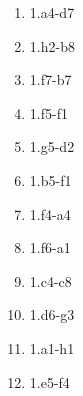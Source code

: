 \begin{enumerate}
\setcounter{enumi}{\value{d_counter}}
\item 1.\queen{}a4-d7\mate{}
\item 1.\queen{}h2-b8\mate{}
\item 1.\queen{}f7-b7\mate{}
\item 1.\queen{}f5-f1\mate{}
\item 1.\queen{}g5-d2\mate{}
\item 1.\queen{}b5-f1\mate{}
\item 1.\queen{}f4-a4\mate{}
\item 1.\queen{}f6-a1\mate{}
\item 1.\queen{}c4-c8\mate{}
\item 1.\queen{}d6-g3\mate{}
\item 1.\queen{}a1-h1\mate{}
\item 1.\queen{}e5-f4\mate{}
\setcounter{d_counter}{\value{enumi}}
\end{enumerate}
